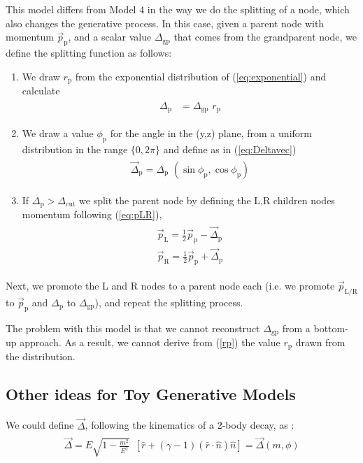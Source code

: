 \documentclass[12pt]{article}
\newcommand{\bea}{\begin{eqnarray}\begin{aligned}}
\newcommand{\eea}{\end{aligned}\end{eqnarray}}
\begin{document}
This model differs from Model 4 in the way we do the splitting of a node, which also changes the generative process. In this case, given a parent node with momentum $\vec{p}_\text{p}$, and a scalar value $\Delta_{\text{gp}}$ that comes from the grandparent node, we define the splitting function as follows:
\begin{enumerate}

\item We draw $r_\text{p}$ from the exponential distribution of (\ref{eq:exponential}) and calculate
\bea\label{rp}
\Delta_\text{p} &= \Delta_\text{gp} \,\, r_\text{p}
\eea

\item We draw a value $\phi_\text{p}$ for the angle in the (y,z) plane, from a uniform distribution in the range $\{0,2\pi\}$ and define as in (\ref{eq:Deltavec})
\bea
\vec{\Delta}_\text{p}= \Delta_\text{p}\,\,(\sin\phi_\text{p},\cos\phi_\text{p})\nonumber
\eea 

\item If $\Delta_\text{p} > \Delta_\text{cut}$ we split the parent node by defining the L,R children nodes momentum following (\ref{eq:pLR}),
\bea
\vec{p}_\text{L}= \frac{1}{2} \vec{p}_\text{p} - \vec{\Delta}_\text{p}  \\
\vec{p}_\text{R}= \frac{1}{2} \vec{p}_\text{p} +\vec{\Delta}_\text{p} \nonumber
\eea

\end{enumerate}

Next, we promote the L and R nodes to a parent node each (i.e. we promote $\vec{p}_\text{L/R}$ to $\vec{p}_\text{p}$ and $\Delta_\text{p}$ to $\Delta_\text{gp}$), and repeat the splitting process.


The problem with this model is that we cannot reconstruct $\Delta_\text{gp}$ from a bottom-up approach. As a result, we cannot derive from (\ref{rp}) the value $r_\text{p}$  drawn from the distribution. 


\subsection{Other ideas for Toy Generative Models}

We could define $\vec{\Delta}$, following the kinematics of a 2-body decay, as :
\bea
 \vec{\Delta}   = E \sqrt{1-\frac{m^2}{E^2}} \,\,\,[ \hat{r} + (\gamma -1) (\hat{r} \cdot \hat{n}) \hat{n} ] = \vec{\Delta}(m,\phi)
\eea
\end{document}
